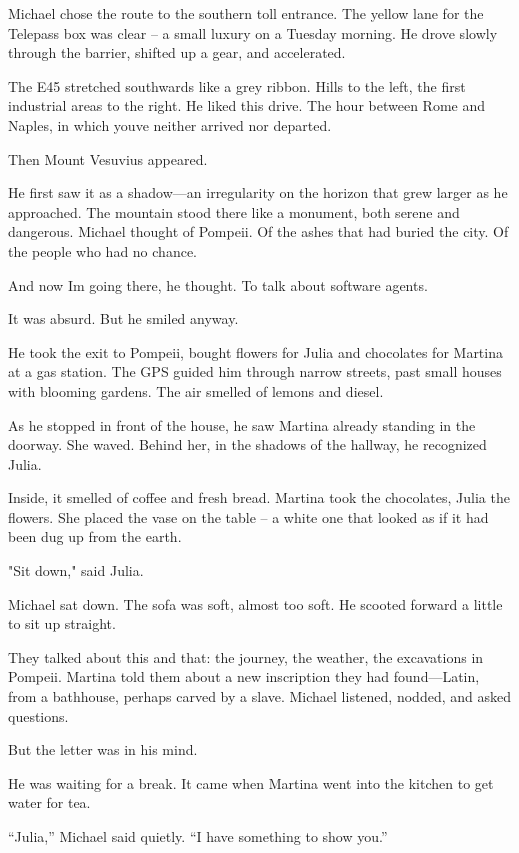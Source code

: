 \documentclass[
]{article}
\begin{document}
Michael chose the route to the southern toll entrance. The yellow lane for the Telepass box was clear -- a small luxury on a Tuesday morning. He drove slowly through the barrier, shifted up a gear, and accelerated.

The E45 stretched southwards like a grey ribbon. Hills to the left, the first industrial areas to the right. He liked this drive. The hour between Rome and Naples, in which you\textquotesingle ve neither arrived nor departed.

Then Mount Vesuvius appeared.

He first saw it as a shadow---an irregularity on the horizon that grew larger as he approached. The mountain stood there like a monument, both serene and dangerous. Michael thought of Pompeii. Of the ashes that had buried the city. Of the people who had no chance.

And now I\textquotesingle m going there, he thought. To talk about software agents.

It was absurd. But he smiled anyway.

He took the exit to Pompeii, bought flowers for Julia and chocolates for Martina at a gas station. The GPS guided him through narrow streets, past small houses with blooming gardens. The air smelled of lemons and diesel.

As he stopped in front of the house, he saw Martina already standing in the doorway. She waved. Behind her, in the shadows of the hallway, he recognized Julia.

Inside, it smelled of coffee and fresh bread. Martina took the chocolates, Julia the flowers. She placed the vase on the table -- a white one that looked as if it had been dug up from the earth.

"Sit down," said Julia.

Michael sat down. The sofa was soft, almost too soft. He scooted forward a little to sit up straight.

They talked about this and that: the journey, the weather, the excavations in Pompeii. Martina told them about a new inscription they had found---Latin, from a bathhouse, perhaps carved by a slave. Michael listened, nodded, and asked questions.

But the letter was in his mind.

He was waiting for a break. It came when Martina went into the kitchen to get water for tea.

``Julia,'' Michael said quietly. ``I have something to show you.''
\end{document}
